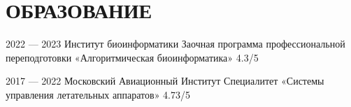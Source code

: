 \section{ОБРАЗОВАНИЕ}

    \learn
    {2022 --- 2023}
    {Институт биоинформатики}
    {Заочная программа профессиональной переподготовки}
    {«Алгоритмическая биоинформатика»}
    {4.3/5}
    
    \learn
    {2017 — 2022}
    {Московский Авиационный Институт}
    {Специалитет}
    {«Системы управления летательных аппаратов»}
    {4.73/5}
